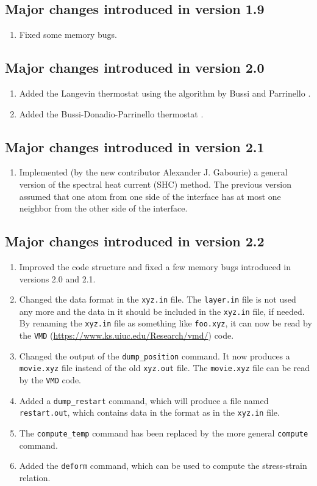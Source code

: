 \documentclass[12pt,a4paper]{report}
\begin{document}
\subsection{Major changes introduced in version 1.9}
\begin{enumerate}
\item Fixed some memory bugs.
\end{enumerate}

\subsection{Major changes introduced in version 2.0}
\begin{enumerate}
    \item Added the Langevin thermostat using the algorithm by Bussi and Parrinello \cite{bussi2007pre}.
    \item Added the Bussi-Donadio-Parrinello thermostat \cite{bussi2007jcp}.
\end{enumerate}

\subsection{Major changes introduced in version 2.1}
\begin{enumerate}
    \item Implemented (by the new contributor Alexander J. Gabourie) a general version of the spectral heat current (SHC) method. The previous version assumed that one atom from one side of the interface has at most one neighbor from the other side of the interface.
\end{enumerate}

\subsection{Major changes introduced in version 2.2}
\begin{enumerate}
    \item Improved the code structure and fixed a few memory bugs introduced in versions 2.0 and 2.1.
    \item Changed the data format in the \verb"xyz.in" file. The \verb"layer.in" file is not used any more and the data in it should be included in the \verb"xyz.in" file, if needed. By renaming the \verb"xyz.in" file as something like \verb"foo.xyz", it can now be read by the \verb"VMD" (\url{https://www.ks.uiuc.edu/Research/vmd/}) code.
    \item Changed the output of the  \verb"dump_position" command. It now produces a \verb"movie.xyz" file instead of the old \verb"xyz.out" file. The \verb"movie.xyz" file can be read by the \verb"VMD" code.
    \item Added a \verb"dump_restart" command, which will produce a file named \verb"restart.out", which contains data in the format as in the \verb"xyz.in" file.
    \item The \verb"compute_temp" command has been replaced by the more general \verb"compute" command.
    \item Added the \verb"deform" command, which can be used to compute the stress-strain relation.
\end{enumerate}
\end{document}
